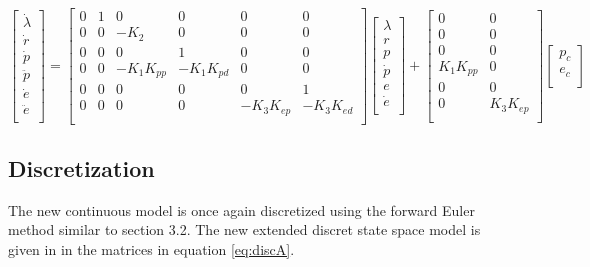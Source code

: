 \documentclass[a4paper, 12pt]{article}\usepackage[utf8]{inputenc}
\begin{document}
\begin{equation}\label{eq:state_space_extended}
     \begin{bmatrix}
    \dot{\lambda}\\
    \dot{r}\\
    \dot{p}\\
    \ddot{p}\\
    \dot{e}\\
    \ddot{e}\\
    \end{bmatrix} = 
    \begin{bmatrix}
    0 & 1 & 0 & 0 & 0 & 0\\
    0 & 0 & -K_2 & 0 & 0 & 0\\
    0 & 0 & 0 & 1 & 0 & 0\\
    0 & 0 & -K_1K_{pp} & -K_{1}K_{pd} & 0 & 0\\
    0 & 0 & 0 & 0 & 0 & 1\\
    0 & 0 & 0 & 0 & -K_3K_{ep} & -K_3K_{ed}\\
    \end{bmatrix} 
    \begin{bmatrix}
    \lambda\\
    r\\
    p\\
    \dot{p}\\
    e\\
    \dot{e}\\
    \end{bmatrix} + 
    \begin{bmatrix}
    0 & 0\\
    0 & 0\\
    0 & 0\\
    K_1K_{pp} & 0\\
    0 & 0\\
    0 & K_3K_{ep}\\
    \end{bmatrix} 
    \begin{bmatrix}
    p_c\\
    e_c\\
    \end{bmatrix}
 \end{equation}  


\subsection{Discretization}
The new continuous model is once again discretized using the forward Euler method similar to section 3.2. The new extended discret state space model is given in  in the matrices in equation \ref{eq:discA}.
\end{document}
